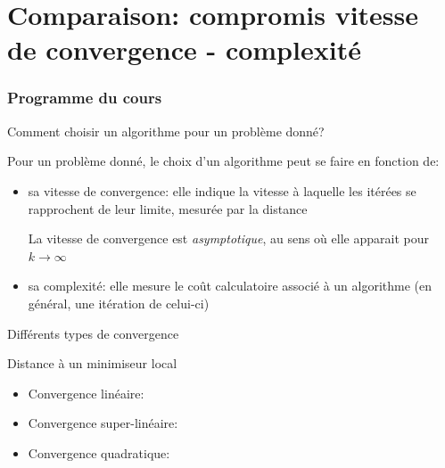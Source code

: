 \documentclass[9pt,table]{beamer} %
\begin{document}
\section{Comparaison: compromis vitesse de convergence - complexité}
\begin{frame}
\frametitle{Programme du cours}
\tableofcontents[currentsection]
\end{frame}


\begin{frame}{Comment choisir un algorithme pour un problème donné?}

Pour un problème donné, le choix d'un algorithme peut se faire en fonction de:

\begin{itemize}[label=-]
  \item \alert{sa vitesse de convergence}: elle indique la vitesse à laquelle les itérées se rapprochent de leur limite, mesurée par la distance 
  
  La vitesse de convergence est \emph{asymptotique}, au sens où elle apparait pour $k \rightarrow \infty$
  \item \alert{sa complexité}: elle mesure le coût calculatoire associé à un algorithme (en général, une itération de celui-ci)
\end{itemize}
\end{frame}



\begin{frame}{Différents types de convergence}
	\begin{tcolorbox}
  Distance à un minimiseur local 
  \end{tcolorbox}

  \begin{itemize}[label=\tiny$\blacksquare$]
    \item Convergence linéaire:
    \item Convergence super-linéaire:
    \item Convergence quadratique:
  \end{itemize}
\end{frame}
\end{document}
